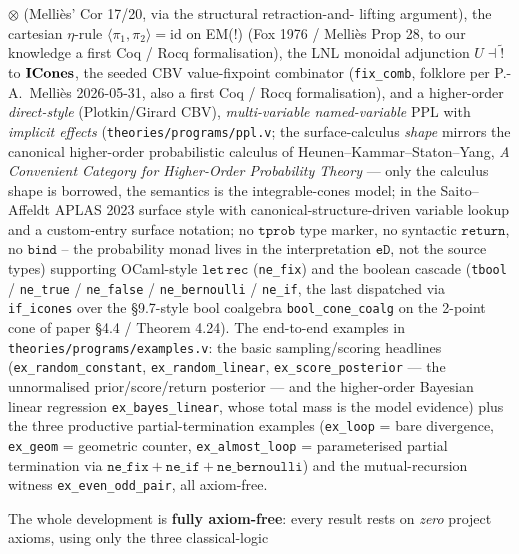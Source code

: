 \begin{itemize}
    $\otimes$ (Melli\`es' Cor 17/20, via the structural retraction-and-
    lifting argument), the cartesian $\eta$-rule
    $\langle \pi_1, \pi_2 \rangle = \mathrm{id}$ on EM(!) (Fox 1976 /
    Melli\`es Prop 28, to our knowledge a first Coq / Rocq
    formalisation), the LNL monoidal adjunction
    $U \dashv \widetilde{\mathord{!}}$ to $\mathbf{ICones}$, the seeded CBV
    value-fixpoint combinator (\texttt{fix\_comb},
    folklore per P.-A.~Melli\`es 2026-05-31, also a first Coq / Rocq
    formalisation), and a higher-order \emph{direct-style}
    (Plotkin/Girard CBV), \emph{multi-variable named-variable}
    PPL with \emph{implicit effects}
    (\texttt{theories/programs/ppl.v}; the surface-calculus
    \emph{shape} mirrors the canonical higher-order probabilistic
    calculus of Heunen--Kammar--Staton--Yang, \emph{A Convenient
    Category for Higher-Order Probability Theory} --- only the
    calculus shape is borrowed, the semantics is the
    integrable-cones model; in the Saito--Affeldt APLAS
    2023 surface style with canonical-structure-driven variable
    lookup and a custom-entry surface notation; no $\mathtt{tprob}$
    type marker, no syntactic $\mathtt{return}$, no $\mathtt{bind}$ --
    the probability monad lives in the interpretation $\mathtt{eD}$,
    not the source types) supporting OCaml-style $\mathtt{let\,rec}$
    (\texttt{ne\_fix}) and the boolean cascade
    (\texttt{tbool} / \texttt{ne\_true} / \texttt{ne\_false} /
    \texttt{ne\_bernoulli} / \texttt{ne\_if}, the last dispatched via
    \texttt{if\_icones} over the \S9.7-style bool coalgebra
    \texttt{bool\_cone\_coalg} on the 2-point cone of paper \S4.4
    / Theorem 4.24). The end-to-end examples in
    \texttt{theories/programs/examples.v}: the basic sampling/scoring
    headlines
    (\texttt{ex\_random\_constant}, \texttt{ex\_random\_linear},
    \texttt{ex\_score\_posterior} --- the unnormalised
    prior/score/return posterior --- and the higher-order Bayesian
    linear regression \texttt{ex\_bayes\_linear}, whose total mass is
    the model evidence) plus the three
    productive partial-termination examples
    (\texttt{ex\_loop} = bare divergence,
    \texttt{ex\_geom} = geometric counter,
    \texttt{ex\_almost\_loop} = parameterised partial termination via
    $\mathtt{ne\_fix} + \mathtt{ne\_if} + \mathtt{ne\_bernoulli}$)
    and the mutual-recursion witness \texttt{ex\_even\_odd\_pair},
    all axiom-free.
\end{itemize}
The whole development is \textbf{fully axiom-free}: every result rests
on \emph{zero} project axioms, using only the three classical-logic
